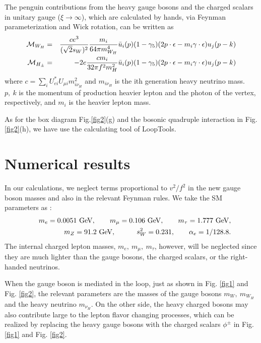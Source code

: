 \documentclass[preprint,aps,12pt,showpacs,nofootinbib,tightenlines]{revtex4}
\newcommand{\bea}{\begin{eqnarray}}
\newcommand{\eea}{\end{eqnarray}}
\begin{document}
The penguin contributions from the heavy gauge bosons
and the charged scalars in unitary gauge ($\xi\to \infty $), which are calculated by hands,
via Feynman parameterization and Wick rotation, can be written
as\cite{l-f-li}
\bea
{\cal M}_{W_H}  &=&\frac{ce^3}{(\sqrt{2}s_W)^2}\frac{m_i}{64\pi m_{W_H}^4}\bar u_i(p)(1-\gamma_5)
(2p\cdot \epsilon - m_i\gamma\cdot \epsilon) u_j(p-k) \\
{\cal M}_{H_\pm}&=&- 2e \frac{cm_i}{32\pi f^2 m_{H}^2}\bar u_i(p)(1-\gamma_5)(2p\cdot \epsilon - m_i\gamma\cdot
\epsilon) u_j(p-k) \label{am_h}
\eea
where $c=\sum\limits_i U^*_{ei}U_{\mu i} m^2_{i\nu_H}$ and $m_{i\nu_H}$ is the ith generation heavy neutrino mass.
$p,~k$ is the momentum of production heavier lepton
and the photon of the vertex, respectively,
and $m_i $ is the heavier lepton mass.

As for the box diagram Fig.\ref{fig2}(g) and the bosonic quadruple interaction in Fig.\ref{fig2}(h),
we have use the calculating tool of LoopTools\cite{looptools}.


\section{Numerical results}
In our calculations, we neglect terms proportional to $v^2/f^2$ in
the new gauge boson masses and also in the relevant Feynman rules.
We take the SM parameters as \cite{pdg-2016}:
\begin{eqnarray}
&& m_{e}=0. 0051\ {\rm GeV}, \quad \quad  m_{\mu}= 0. 106\ {\rm GeV},
\quad \quad  m_\tau= 1. 777\ {\rm GeV}, \nonumber \\ &&  m_Z =91. 2\
{\rm GeV}, \quad \quad \quad s^{2}_{W}= 0. 231, \quad \quad
\alpha_e=1/128. 8.  \nonumber
\end{eqnarray}
The internal charged lepton masses, $m_e,~m_\mu,~m_\tau$, however, will
be neglected since they are much lighter than the gauge bosons, the charged scalars,
or the right-handed neutrinos. %

  When the gauge boson is mediated in the loop, just as shown in Fig. \ref{fig1} and Fig. \ref{fig2},
   the relevant parameters are the masses of the gauge bosons $m_W,~m_{W_H}$
and the heavy neutrino $m_{\nu_H}$. %
On the other side, the heavy charged bosons may also contribute large to the lepton flavor changing processes,
which can be realized by replacing the heavy gauge bosons with the charged scalars $\phi^\pm$ in Fig.\ref{fig1} and Fig. \ref{fig2}.
\end{document}
